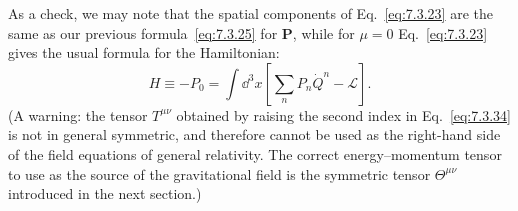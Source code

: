 As a check, we may note that the spatial components of Eq.~\eqref{eq:7.3.23} are the
same as our previous formula~\eqref{eq:7.3.25} for $\mathbf{P}$, while for $\mu=0$
Eq.~\eqref{eq:7.3.23} gives the usual formula for the Hamiltonian:
\begin{equation}
H\equiv-P_0=\int \dd^3x\left[\sum_nP_n\dot Q^n-\mathcal{L}\right].
\tag{7.3.35}\label{eq:7.3.35}
\end{equation}
(A warning: the tensor $T^{\mu\nu}$ obtained by raising the second index in
Eq.~\eqref{eq:7.3.34} is not in general symmetric, and therefore cannot be used as the
right-hand side of the field equations of general relativity. The correct
energy--momentum tensor to use as the source of the gravitational field is the
symmetric tensor $\Theta^{\mu\nu}$ introduced in the next section.)

